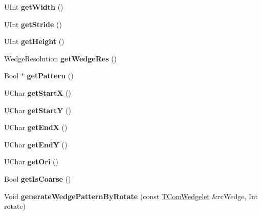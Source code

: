 \begin{DoxyCompactItemize}
\mbox{\label{class_t_com_wedgelet_a112518c15b8dd57fafefb04f2039439a}} 
U\+Int {\bfseries get\+Width} ()
\item 
\mbox{\label{class_t_com_wedgelet_ae120141eede87fc13e9e0cebc3f8a3af}} 
U\+Int {\bfseries get\+Stride} ()
\item 
\mbox{\label{class_t_com_wedgelet_a4888cc6d165713eb0008c951488bd263}} 
U\+Int {\bfseries get\+Height} ()
\item 
\mbox{\label{class_t_com_wedgelet_a742a276c823a94480cb99c512fc40837}} 
Wedge\+Resolution {\bfseries get\+Wedge\+Res} ()
\item 
\mbox{\label{class_t_com_wedgelet_a8fbfbb2329a436f3a882300224fdd0be}} 
Bool $\ast$ {\bfseries get\+Pattern} ()
\item 
\mbox{\label{class_t_com_wedgelet_afe69c5cf9587a25249eb296bd4320e56}} 
U\+Char {\bfseries get\+StartX} ()
\item 
\mbox{\label{class_t_com_wedgelet_a1957a92d0b8d25844a7657801436378c}} 
U\+Char {\bfseries get\+StartY} ()
\item 
\mbox{\label{class_t_com_wedgelet_a1e436edb36c7d3f701e2669c4c17afc2}} 
U\+Char {\bfseries get\+EndX} ()
\item 
\mbox{\label{class_t_com_wedgelet_ab512dcb3d8ced71203dd4a08fdd16d09}} 
U\+Char {\bfseries get\+EndY} ()
\item 
\mbox{\label{class_t_com_wedgelet_a7395a3f8b3fff91f7d54645208826e9c}} 
U\+Char {\bfseries get\+Ori} ()
\item 
\mbox{\label{class_t_com_wedgelet_afb40707b0a566f6cb26a27bec225b494}} 
Bool {\bfseries get\+Is\+Coarse} ()
\item 
\mbox{\label{class_t_com_wedgelet_a0c9054ff718a3b02b33a249625cb0b7c}} 
Void {\bfseries generate\+Wedge\+Pattern\+By\+Rotate} (const \hyperlink{class_t_com_wedgelet}{T\+Com\+Wedgelet} \&rc\+Wedge, Int rotate)

\end{DoxyCompactItemize}
